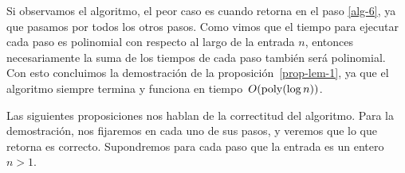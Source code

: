 \documentclass[10pt]{article}
\newcommand{\0}{\mathbf{0}}
\newcommand{\1}{\mathbf{1}}
\newcommand{\poly}{{\rm poly}}
\newcommand{\+}{\oplus}
\newcommand{\comentario}[1]{}
\theoremstyle{remark}
\theoremstyle{remark}
\begin{document}
	
	
	Si observamos el algoritmo, el peor caso es cuando retorna en el paso \ref{alg-6}, ya que pasamos por todos los otros pasos. Como vimos que el tiempo para ejecutar cada paso es polinomial con respecto al largo de la entrada $n$, entonces necesariamente la suma de los tiempos de cada paso también será polinomial. Con esto concluimos la demostración de la
        proposición~\ref{prop-lem-1},
        ya que 
	el algoritmo siempre termina y funciona en tiempo~$O(\poly(\log n))$.
	
	Las siguientes proposiciones nos hablan de la correctitud del algoritmo. Para la demostración, nos fijaremos en cada uno de sus pasos, y veremos que lo que retorna es correcto.
	Supondremos para cada paso que la entrada es un entero $n>1$.
	
\end{document}
